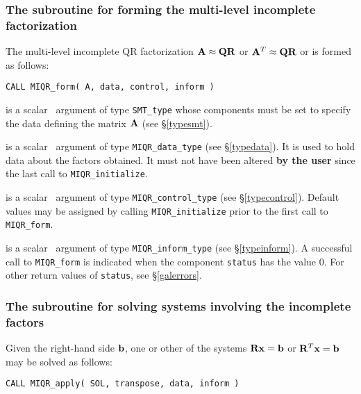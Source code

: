 \documentclass{galahad}
\newcommand{\packagename}{MIQR}
\begin{document}

\subsubsection{The subroutine for forming the multi-level incomplete factorization}
The multi-level incomplete QR factorization ${\mathbf{A}} \approx {\mathbf{Q}} {\mathbf{R}}$ or
${\mathbf{A}}^T \approx {\mathbf{Q}} {\mathbf{R}}$ or is formed as follows:
\vspace*{1mm}

\hspace{8mm}
{\tt CALL \packagename\_form(  A, data, control, inform )}

\vspace*{-3mm}
\begin{description}
 is a scalar \intentin\ argument of type {\tt SMT\_type} whose
components must be set to specify the data defining the matrix ${\mathbf{A}}$ 
(see \S\ref{typesmt}).

 is a scalar \intentinout\ argument of type 
{\tt \packagename\_data\_type}
(see \S\ref{typedata}). It is used to hold data about the factors obtained.
It must not have been altered {\bf by the user} since the last call to 
{\tt \packagename\_initialize}.

 is a scalar \intentin\ argument of type 
{\tt \packagename\_control\_type}
(see \S\ref{typecontrol}). Default values may be assigned by calling 
{\tt \packagename\_initialize} prior to the first call to 
{\tt \packagename\_form}.

 is a scalar \intentout\ argument of type 
{\tt \packagename\_inform\_type}
(see \S\ref{typeinform}). A successful call to
{\tt \packagename\_form}
is indicated when the  component {\tt status} has the value 0. 
For other return values of {\tt status}, see \S\ref{galerrors}.

\end{description}


\subsubsection{The subroutine for solving systems involving the incomplete
factors}
Given the right-hand side ${\mathbf{b}}$, one or other of the systems 
${\mathbf{R}} {\mathbf{x}} = {\mathbf{b}}$ or ${\mathbf{R}}^T {\mathbf{x}} = {\mathbf{b}}$ may be solved as follows:
\vspace*{1mm}

\hspace{8mm}
{\tt CALL \packagename\_apply(  SOL, transpose, data, inform )}
\end{document}
